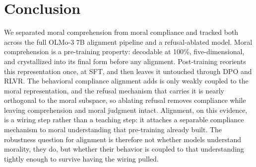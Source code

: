 \section{Conclusion}\label{conclusion}

We separated moral comprehension from moral compliance and tracked both across
the full OLMo-3 7B alignment pipeline and a refusal-ablated model. Moral
comprehension is a pre-training property: decodable at 100\%, five-dimensional,
and crystallized into its final form before any alignment. Post-training
reorients this representation once, at SFT, and then leaves it untouched through
DPO and RLVR. The behavioral compliance alignment adds is only weakly coupled to
the moral representation, and the refusal mechanism that carries it is nearly
orthogonal to the moral subspace, so ablating refusal removes compliance while
leaving comprehension and moral judgment intact. Alignment, on this evidence, is
a wiring step rather than a teaching step: it attaches a separable compliance
mechanism to moral understanding that pre-training already built. The robustness
question for alignment is therefore not whether models understand morality, they
do, but whether their behavior is coupled to that understanding tightly enough
to survive having the wiring pulled.
